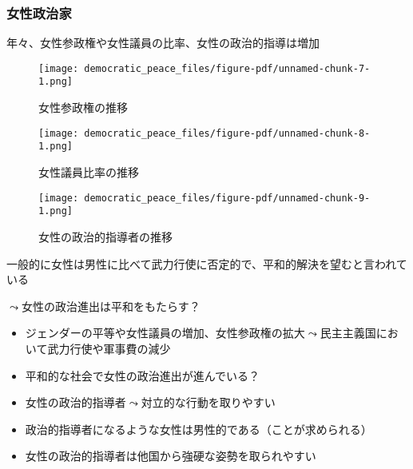 \documentclass[
  xelatex,
  ja=standard]{bxjsarticle}
\providecommand{\tightlist}{%
  \setlength{\itemsep}{0pt}\setlength{\parskip}{0pt}}\usepackage{longtable,booktabs,array}
\begin{document}
\hypertarget{ux5973ux6027ux653fux6cbbux5bb6}{%
\subsubsection{女性政治家}\label{ux5973ux6027ux653fux6cbbux5bb6}}

年々、女性参政権や女性議員の比率、女性の政治的指導は増加

\begin{figure}[htpb]

{\centering \texttt{[image: democratic\_peace\_files/figure-pdf/unnamed-chunk-7-1.png]}

}

\caption{女性参政権の推移}

\end{figure}

\begin{figure}[htpb]

{\centering \texttt{[image: democratic\_peace\_files/figure-pdf/unnamed-chunk-8-1.png]}

}

\caption{女性議員比率の推移}

\end{figure}

\begin{figure}[htpb]

{\centering \texttt{[image: democratic\_peace\_files/figure-pdf/unnamed-chunk-9-1.png]}

}

\caption{女性の政治的指導者の推移}

\end{figure}

一般的に女性は男性に比べて武力行使に否定的で、平和的解決を望むと言われている

\(\leadsto\)女性の政治進出は平和をもたらす？

\begin{itemize}
\tightlist
\item
  ジェンダーの平等や女性議員の増加、女性参政権の拡大\(\leadsto\)民主主義国において武力行使や軍事費の減少\citep{reiter2015, barnhart2020}
\item
  平和的な社会で女性の政治進出が進んでいる？
\item
  女性の政治的指導者\(\leadsto\)対立的な行動を取りやすい\citep{koch2011, caprioli2001}
\item
  政治的指導者になるような女性は男性的である（ことが求められる）\citep{schramm2020}
\item
  女性の政治的指導者は他国から強硬な姿勢を取られやすい\citep{schwartz2020}
\end{itemize}
\end{document}
